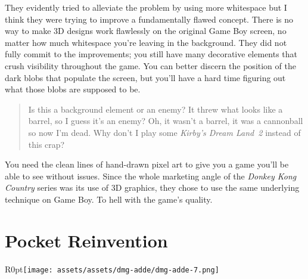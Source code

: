 \documentclass{book}
\begin{document}
\begin{minipage}{0.45\linewidth}\end{minipage}\vspace{2pt}
\begin{minipage}{0.45\linewidth}\end{minipage}\vspace{2pt}
\begin{minipage}{0.45\linewidth}\end{minipage}
\par\justifying
They evidently tried to alleviate the problem by using more whitespace but I think they were trying to improve a fundamentally flawed concept. There is no way to make 3D designs work flawlessly on the original Game Boy screen, no matter how much whitespace you’re leaving in the background. They did not fully commit to the improvements; you still have many decorative elements that crush visibility throughout the game. You can better discern the position of the dark blobs that populate the screen, but you’ll have a hard time figuring out what those blobs are supposed to be.\par
\begin{quote}
Is this a background element or an enemy? It threw what looks like a barrel, so I guess it’s an enemy? Oh, it wasn’t a barrel, it was a cannonball so now I’m dead. Why don’t I play some \emph{Kirby’s Dream Land~2} instead of this crap?\par
\end{quote} \par
You need the clean lines of hand-drawn pixel art to give you a game you’ll be able to see without issues. Since the whole marketing angle of the \emph{Donkey Kong Country} series was its use of 3D graphics, they chose to use the same underlying technique on Game Boy. To hell with the game’s quality.\par
\FloatBarrier\section*{Pocket Reinvention}
\begin{wrapfigure}{R}{0pt}{\texttt{[image: assets/assets/dmg-adde/dmg-adde-7.png]}}\end{wrapfigure}
\end{document}
